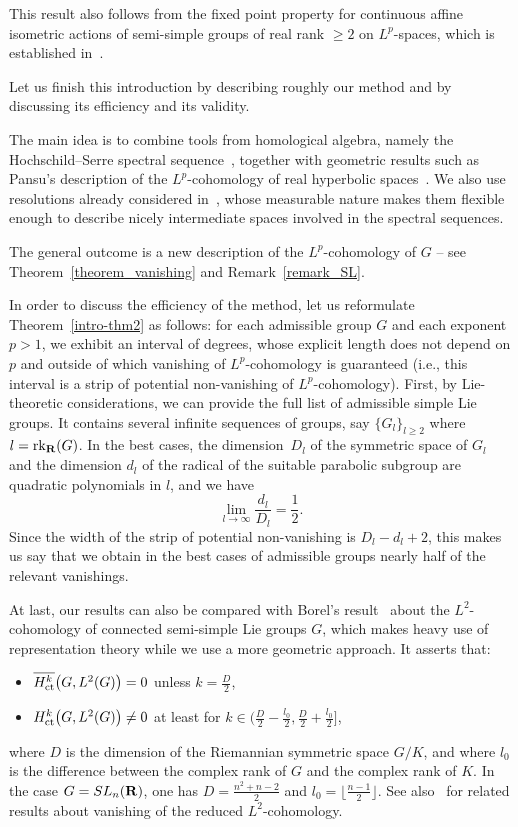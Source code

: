 \documentclass[11pt]{article}
\theoremstyle{definition}
\numberwithin{equation}{section}
\numberwithin{figure}{section}
\numberwithin{table}{section}
\DeclareMathOperator{\ct}{ct}
\DeclareMathOperator{\rk}{rk}
\begin{document}
This result also follows from the fixed point property for continuous affine isometric actions of semi-simple groups of real rank $\geqslant 2$ on $L^p$-spaces, which is established in~\cite{BFGM}.


Let us finish this introduction by describing roughly our method and by discussing its efficiency and its validity.

The main idea is to combine tools from homological algebra, namely the Hochschild--Serre spectral sequence~\cite[Chapter~IX, \textsection~4]{BW}, together with geometric results such as Pansu's description of the $L^p$-cohomology of real hyperbolic spaces~\cite{P1,Pa99}. We also use resolutions already considered in~\cite{Bl}, whose measurable nature makes them flexible enough to describe nicely intermediate spaces involved in the spectral sequences.

The general outcome is a new description of the $L^p$-cohomology of $G$ -- see Theorem~\ref{theorem_vanishing} and Remark~\ref{remark_SL}.

In order to discuss the efficiency of the method, let us reformulate Theorem~\ref{intro-thm2} as follows: for each admissible group $G$ and each exponent $p>1$, we exhibit an interval of degrees, whose explicit length does not depend on $p$ and outside of which vanishing of $L^p$-cohomology is guaranteed (i.e., this interval is a strip of potential non-vanishing of $L^p$-cohomology). First, by Lie-theoretic considerations, we can provide the full list of admissible simple Lie groups. It contains several infinite sequences of groups, say $\{ G_l \}_{l \geqslant 2}$ where $l=\rk_{\bf R} (G)$. In the best cases, the dimension~$D_l$ of the symmetric space of $G_l$ and the dimension $d_l$ of the radical of the suitable parabolic subgroup are quadratic polynomials in $l$, and we have
\[ 
\lim_{l \to \infty} \frac{d_l}{D_l} = \frac{1}{2}.
\]
Since the width of the strip of potential non-vanishing is $D_l-d_l+2$, this makes us say that we obtain in the best cases of admissible groups nearly half of the relevant vanishings.

At last, our results can also be compared with Borel's result~\cite{Borel} about the $L^2$-cohomology of connected semi-simple Lie groups $G$, which makes heavy use of representation theory while we use a more geometric approach. It asserts that:
\begin{itemize}
\item $\overline{{\rm H}^k_{\ct}} \bigl(G, L^2(G) \bigr) = 0$ unless $k = \frac{D}{2}$,
\item ${\rm H}^k_{\ct} \bigl(G, L^2(G) \bigr) \neq 0$ at least for $k \in \bigl(\frac{D}{2} - \frac{l_0}{2}, \frac{D}{2} +\frac{l_0}{2}\bigr]$,
\end{itemize}
where $D$ is the dimension of the Riemannian symmetric space $G/K$, and where $l_0$ is the difference between the complex rank of $G$ and the complex rank of $K$. In the case $G =  SL_n({\bf R})$, one has $D = \frac{n^2 + n -2}{2}$ and $l_0 = \lfloor \frac{n-1}{2} \rfloor$. See also~\cite{BFS} for related results about vanishing of the reduced $L^2$-cohomology.
\end{document}

